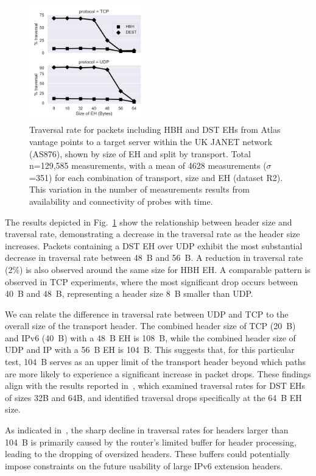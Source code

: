 \documentclass[conference]{IEEEtran}
\begin{document}
\begin{figure}[t]
\centering
  \includegraphics[width=0.45\textwidth]{sizes.png}
  \caption{Traversal rate for packets including HBH and DST EHs from Atlas
vantage points to a target server within the UK JANET network (AS876), shown by
size of EH and split by transport.  Total n=129,585 measurements, with a mean
of 4628 measurements ($\sigma$=351) for each combination of transport, size and
EH (dataset R2). This variation in the number of measurements results from
availability and connectivity of  probes with time.  }

  \label{fig:sizes}
\end{figure}
 

The results depicted in Fig.~\ref{fig:sizes} show the relationship between
header size and traversal rate, demonstrating a decrease in the traversal rate
as the header size increases.  Packets containing a DST EH over UDP exhibit the
most substantial decrease in traversal rate between 48~B and 56~B. A reduction
in traversal rate (2\%) is also observed around the same size for HBH EH. A
comparable pattern is observed in TCP experiments, where the most significant
drop occurs between 40~B and 48~B, representing a header size 8~B smaller than
UDP.

We can relate the difference in traversal rate between UDP and TCP to the overall
size of the transport header.  The combined header size of TCP (20~B) and IPv6
(40~B) with a 48~B EH is 108~B, while the combined header size of UDP and IP
with a 56~B EH is 104~B. This suggests that, for this particular test, 104~B
serves as an upper limit of the transport header beyond which paths are more
likely to experience a significant increase in packet drops. These findings
align with the results reported in~\cite{james-imc}, which examined traversal
rates for DST EHs of sizes 32B and 64B, and identified traversal drops
specifically at the 64~B EH size.

As indicated in~\cite{james-imc}, the sharp decline in traversal rates for
headers larger than 104~B is primarily caused by the router's limited buffer
for header processing, leading to the dropping of oversized headers.
These buffers could potentially impose constraints on the future usability of
large IPv6 extension headers.
\end{document}
